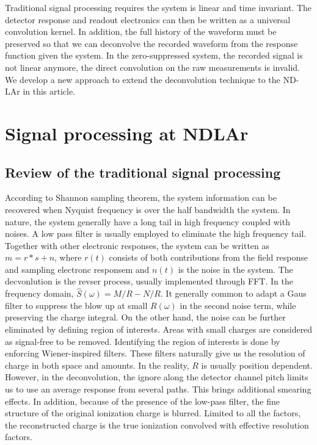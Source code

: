 \documentclass[a4paper,11pt]{article}
\begin{document}
Traditional signal processing requires the system is linear and time invariant. The detector response and readout electronics can then be written as a universal convolution kernel. In addition, the full history of the waveform must be preserved so that we can deconvolve the recorded waveform from the response function given the system. In the zero-suppressed system, the recorded signal is not linear anymore, the direct convolution on the raw measurements is invalid. We develop a new approach to extend the deconvolution technique to the ND-LAr in this article.

\section{Signal processing at NDLAr}
\subsection{Review of the traditional signal processing}
According to Shannon sampling theorem, the system information can be recovered when Nyquist frequency is over the half bandwidth the system. In nature, the system generally have a long tail in high frequency coupled with noises. A low pass filter is usually employed to eliminate the high frequency tail. Together with other electronic responses, the system can be written as $m=r*s+n$, where $r(t)$ consists of both contributions from the field response and sampling electronc responsem and $n(t)$ is the noise in the system. The decvonlution is the revser process, usually implemented through FFT. In the frequency domain, $\hat{S}(\omega)=M/R-N/R$. It generally common to adapt a Gaus filter to suppress the blow up at small $R(\omega)$ in the second noise term, while preserving the charge integral. On the other hand, the noise can be further eliminated by defining region of interests. Areas with small charges are considered as signal-free to be removed. Identifying the region of interests is done by enforcing Wiener-inspired filters. These filters naturally give us the resolution of charge in both space and amounts. In the reality, $R$ is usually position dependent. However, in the deconvolution, the ignore along the detector channel pitch limits us to use an average response from several paths. This brings additional smearing effects. In addition, because of the presence of the low-pass filter, the fine structure of the original ionization charge is blurred. Limited to all the factors, the reconstructed charge is the true ionization convolved with effective resolution factors.
\end{document}
